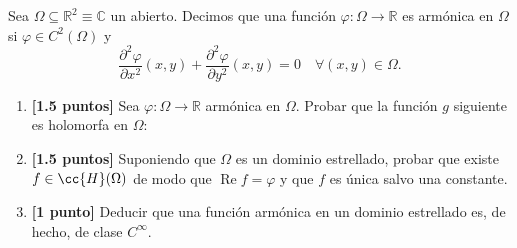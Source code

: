 \documentclass[12pt]{article}
\renewcommand{\Re}{\operatorname{Re}} %
\begin{document}
    \begin{ejercicio}
        Sea $\Omega\subseteq \mathbb{R}^2 \equiv\mathbb{C}$ un abierto. Decimos que una función $\varphi:\Omega\to\mathbb{R}$ es armónica en $\Omega$ si $\varphi \in C^2(\Omega)$ y
        \begin{equation*}
            \frac{\partial^2 \varphi}{\partial x^2}(x,y)+\frac{\partial^2 \varphi}{\partial y^2}(x,y) = 0 \quad \forall (x,y) \in \Omega.
        \end{equation*}
        \begin{enumerate}
            \item \textbf{[1.5 puntos]} Sea $\varphi:\Omega\to\mathbb{R}$ armónica en $\Omega$. Probar que la función $g$ siguiente es holomorfa en $\Omega$:
            \item \textbf{[1.5 puntos]} Suponiendo que $\Omega$ es un dominio estrellado, probar que existe $f \in \cc{H}(\Omega)$ de modo que $\Re f = \varphi$ y que $f$ es única salvo una constante.
            \item \textbf{[1 punto]} Deducir que una función armónica en un dominio estrellado es, de hecho, de clase $C^{\infty}$.
        \end{enumerate}
    \end{ejercicio}

    \newpage
    \setcounter{ejercicio}{0}
\end{document}
